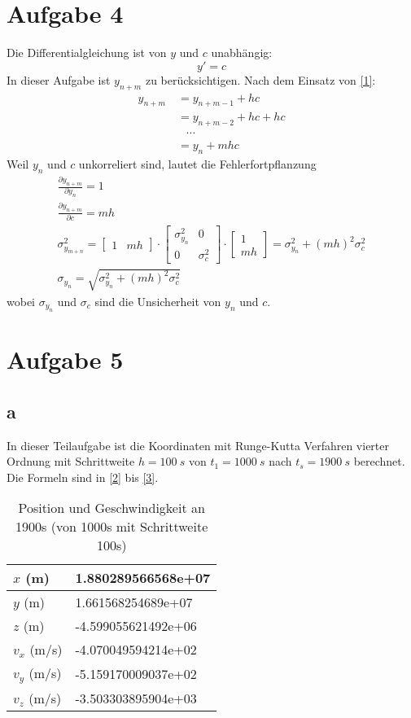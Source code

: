 \section{Aufgabe 4}
Die Differentialgleichung ist von $y$ und $c$ unabhängig:
\begin{equation}\label{1}
	y' = c
\end{equation}
In dieser Aufgabe ist $y_{n+m}$ zu berücksichtigen. Nach dem Einsatz von \ref{1}:
\begin{align}
	y_{n+m} & \ = y_{n+m-1} + hc \\
	& \ = y_{n+m-2} +hc+hc \\
	 & \quad \cdots  \\
	 & \ = y_n + mhc
\end{align}
Weil $y_n$ und $c$ unkorreliert sind, lautet die Fehlerfortpflanzung
\begin{gather}
	\frac{\partial y_{n+m}}{\partial y_n} = 1 \\
	\frac{\partial y_{n+m}}{\partial c} = mh \\
	\sigma^2_{y_{m+n}} = \begin{bmatrix}
	1 & mh
	\end{bmatrix} \cdot \begin{bmatrix}
	\sigma^2_{y_n} & 0 \\
	0 & \sigma^2_{c}
	\end{bmatrix} \cdot \begin{bmatrix}
	1 \\
    mh
	\end{bmatrix} = \sigma^2_{y_n} + (mh)^2\sigma^2_{c}\\
	\sigma_{y_n} = \sqrt{\sigma^2_{y_n} + (mh)^2\sigma^2_{c}}
\end{gather}
wobei $\sigma_{y_n}$ und $\sigma_{c}$ sind die Unsicherheit von $y_n$ und $c$. \clearpage
\section{Aufgabe 5}
\subsection{a}\label{seca}
In dieser Teilaufgabe ist die Koordinaten mit Runge-Kutta Verfahren vierter Ordnung mit Schrittweite $h = \SI{100}{s}$ von $t_1 = \SI{1000}{s}$ nach $t_s = \SI{1900}{s}$ berechnet. Die Formeln sind in \ref{2} bis \ref{3}. 
\begin{table}[htbp] \centering
	\begin{tabular}{|l|l|}
		\hline
		$x$ (m)     & 1.880289566568e+07  \\ \hline
		$y$ (m)     & 1.661568254689e+07  \\ \hline
		$z$ (m)     & -4.599055621492e+06 \\ \hline
		$v_x$ (m/s) & -4.070049594214e+02  \\ \hline
		$v_y$ (m/s) & -5.159170009037e+02 \\ \hline
		$v_z$ (m/s) & -3.503303895904e+03 \\ \hline
	\end{tabular}
	\caption{Position und Geschwindigkeit an 1900s (von 1000s mit Schrittweite 100s)}
\end{table}
